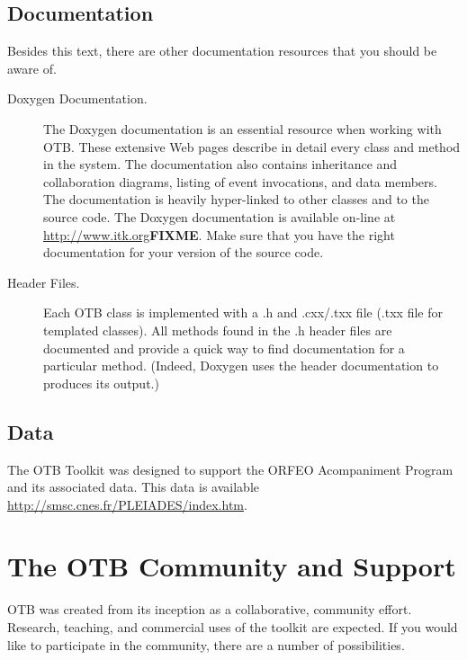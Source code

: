 \subsection{Documentation}
\label{sec:Documentation}

Besides this text, there are other documentation resources that you should be
aware of.
\begin{description}
        \item[Doxygen Documentation.] The Doxygen documentation is an
        essential resource when working with OTB. These extensive Web pages
        describe in detail every class and method in the system. The
        documentation also contains inheritance and collaboration diagrams,
        listing of event invocations, and data members. The documentation is
        heavily hyper-linked to other classes and to the source code. The
        Doxygen documentation is available on-line at
        \url{http://www.itk.org}\textbf{FIXME}. Make sure that you have the right documentation
        for your version of the source code.

	\item[Header Files.] Each OTB class is implemented with a .h and
        .cxx/.txx file (.txx file for templated classes). All methods
        found in the .h header files are documented and provide a quick way
        to find documentation for a particular method. (Indeed, Doxygen uses
        the header documentation to produces its output.)
\end{description}

\subsection{Data}
\label{sec:Data}

The OTB Toolkit was designed to support the ORFEO Acompaniment Program 
and its associated data. This data is available \url{http://smsc.cnes.fr/PLEIADES/index.htm}.


\section{The OTB Community and Support}
\label{sec:AdditionalResources}

OTB was created from its inception as a collaborative, community
effort. Research, teaching, and commercial uses of the toolkit are
expected. If you would like to participate in the community, there are a
number of possibilities.

